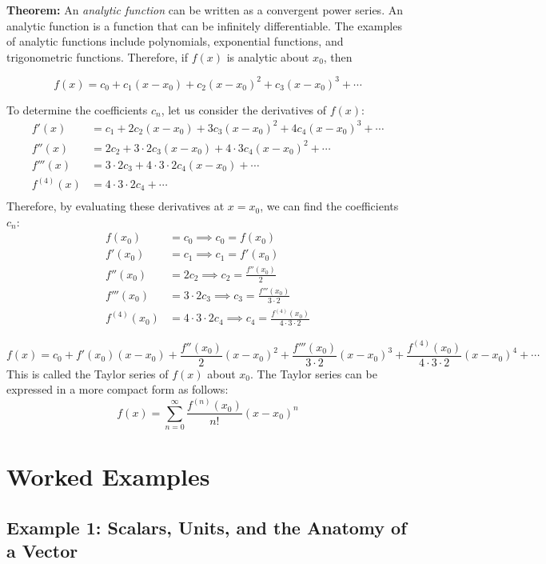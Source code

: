 \documentclass[../main.tex]{subfiles}
\begin{document}
\textbf{Theorem:} An \emph{analytic function} can be written as a convergent power series. An analytic function is a function that can be infinitely differentiable. The examples of analytic functions include polynomials, exponential functions, and trigonometric functions. Therefore, if $f(x)$ is analytic about $x_0$, then

\[
f(x) = c_0 + c_1(x-x_0) + c_2(x-x_0)^2 + c_3(x-x_0)^3 + \cdots
\]

To determine the coefficients \(c_n\), let us consider the derivatives of \(f(x)\):
\begin{align*}
f'(x) &= c_1 + 2c_2(x-x_0) + 3c_3(x-x_0)^2 + 4c_4(x-x_0)^3 + \cdots \\
f''(x) &= 2c_2 + 3 \cdot 2c_3(x-x_0) + 4 \cdot 3c_4(x-x_0)^2 + \cdots \\
f'''(x) &= 3 \cdot 2c_3 + 4 \cdot 3 \cdot 2c_4(x-x_0) + \cdots \\
f^{(4)}(x) &= 4 \cdot 3 \cdot 2c_4 + \cdots \\
\end{align*}
Therefore, by evaluating these derivatives at \(x = x_0\), we can find the coefficients \(c_n\):
\begin{align*}
    f(x_0) &= c_0 \implies c_0 = f(x_0) \\
    f'(x_0) &= c_1 \implies c_1 = f'(x_0) \\
    f''(x_0) &= 2c_2 \implies c_2 = \frac{f''(x_0)}{2} \\
    f'''(x_0) &= 3 \cdot 2c_3 \implies c_3 = \frac{f'''(x_0)}{3 \cdot 2} \\
    f^{(4)}(x_0) &= 4 \cdot 3 \cdot 2c_4 \implies c_4 = \frac{f^{(4)}(x_0)}{4 \cdot 3 \cdot 2}
\end{align*}

\[
f(x) = c_0 + f'(x_0)(x-x_0) + \frac{f''(x_0)}{2}(x-x_0)^2 + \frac{f'''(x_0)}{3 \cdot 2}(x-x_0)^3 + \frac{f^{(4)}(x_0)}{4 \cdot 3 \cdot 2}(x-x_0)^4 + \cdots
\]
This is called the Taylor series of \(f(x)\) about \(x_0\). The Taylor series can be expressed in a more compact form as follows:
\[
f(x) = \sum_{n=0}^{\infty} \frac{f^{(n)}(x_0)}{n!}(x-x_0)^n
\]

\section{Worked Examples}

\subsection{Example 1: Scalars, Units, and the Anatomy of a Vector}
\end{document}
